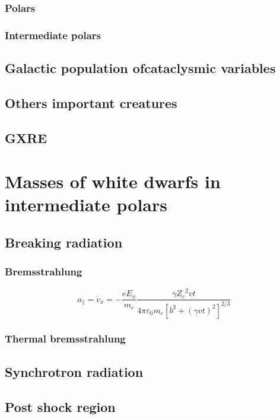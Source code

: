 \documentclass[oneside,a4paper,11pt]{report}
\begin{document}
\subsection{Polars}
\subsection{Intermediate polars}
\section{Galactic population ofcataclysmic variables }
\section{Others important creatures}
\section{GXRE}



\chapter{Masses of white dwarfs in intermediate polars}
\section{Breaking radiation}
\subsection{Bremsstrahlung}
\begin{equation}
 a_{\parallel} = \dot{v}_x = -\frac{eE_x}{m_e}\frac{\gamma {Z_e}^2 vt}{4\pi \varepsilon_0 m_e \left [ b^2 + \left ( \gamma vt \right )^2  \right ]^{2/3}} 
\end{equation}

\subsection{Thermal bremsstrahlung}



\section{Synchrotron radiation}
\section{Post shock region}
\end{document}
